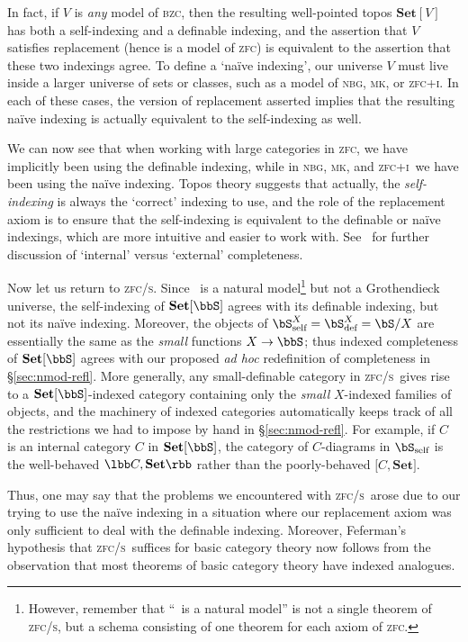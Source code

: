 \documentclass{amsart}
\newcommand{\Set}{\ensuremath{\mathbf{Set}}}
\def\zfc{\textsc{zfc}}
\def\zfci{\textsc{zfc+i}}
\def\zfcs{\textsc{zfc/s}}
\def\nbg{\textsc{nbg}}
\def\mk{\textsc{mk}}
\def\bzc{\textsc{bzc}}
\begin{document}
In fact, if $V$ is \emph{any} model of \bzc, then the resulting
well-pointed topos $\Set[V]$ has both a self-indexing and a definable
indexing, and the assertion that $V$ satisfies replacement (hence is a
model of \zfc) is equivalent to the assertion that these two indexings
agree.  To define a `na\"ive indexing', our universe $V$ must live
inside a larger universe of sets or classes, such as a model of \nbg,
\mk, or \zfci.  In each of these cases, the version of replacement
asserted implies that the resulting na\"ive indexing is actually
equivalent to the self-indexing as well.

We can now see that when working with large categories in \zfc, we
have implicitly been using the definable indexing, while in \nbg, \mk,
and \zfci\ we have been using the na\"ive indexing.  Topos theory
suggests that actually, the \emph{self-indexing} is always the
`correct' indexing to use, and the role of the replacement axiom is to
ensure that the self-indexing is equivalent to the definable or
na\"ive indexings, which are more intuitive and easier to work with.
See~\cite[\S 17]{streicher:fibredcats} for further discussion of
`internal' versus `external' completeness.

Now let us return to \zfcs.  Since \bbS\ is a natural
model\footnote{However, remember that ``\bbS\ is a natural model'' is
  not a single theorem of \zfcs, but a schema consisting of one
  theorem for each axiom of \zfc.} but not a Grothendieck universe,
the self-indexing of $\Set[\bbS]$ agrees with its definable indexing,
but not its na\"ive indexing.  Moreover, the objects of
$\bS^X_{\text{self}} = \bS^X_{\text{def}}=\bS/X$ are essentially the
same as the \emph{small} functions $X\to\bbS$; thus indexed
completeness of $\Set[\bbS]$ agrees with our proposed \emph{ad hoc}
redefinition of completeness in \S\ref{sec:nmod-refl}.  More
generally, any small-definable category in \zfcs\ gives rise to a
$\Set[\bbS]$-indexed category containing only the \emph{small}
$X$-indexed families of objects, and the machinery of indexed
categories automatically keeps track of all the restrictions we had to
impose by hand in \S\ref{sec:nmod-refl}.  For example, if $C$ is an
internal category $C$ in $\Set[\bbS]$, the category of $C$-diagrams in
$\bS_{\text{self}}$ is the well-behaved $\lbb C,\Set\rbb$ rather
than the poorly-behaved $\pmb[C,\Set\pmb]$.

Thus, one may say that the problems we encountered with \zfcs\ arose
due to our trying to use the na\"ive indexing in a situation where our
replacement axiom was only sufficient to deal with the definable
indexing.  Moreover, Feferman's hypothesis that \zfcs\ suffices for
basic category theory now follows from the observation that most
theorems of basic category theory have indexed analogues.
\end{document}
